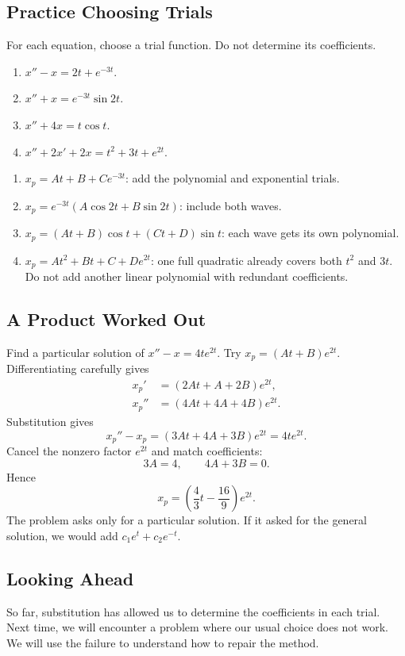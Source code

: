 \documentclass[10pt,letterpaper]{article}
\begin{document}
\subsection{Practice Choosing Trials}
\begin{example}{For each equation, choose a trial function. Do not determine its coefficients.
\begin{enumerate}
\item $x''-x=2t+e^{-3t}$.
\item $x''+x=e^{-3t}\sin 2t$.
\item $x''+4x=t\cos t$.
\item $x''+2x'+2x=t^2+3t+e^{2t}$.
\end{enumerate}}
\begin{enumerate}
\item $x_p=At+B+Ce^{-3t}$: add the polynomial and exponential trials.
\item $x_p=e^{-3t}(A\cos 2t+B\sin 2t)$: include both waves.
\item $x_p=(At+B)\cos t+(Ct+D)\sin t$: each wave gets its own polynomial.
\item $x_p=At^2+Bt+C+De^{2t}$: one full quadratic already covers both $t^2$ and $3t$.
Do not add another linear polynomial with redundant coefficients.
\end{enumerate}
\end{example}

\subsection{A Product Worked Out}
\begin{example}{Find a particular solution of $x''-x=4te^{2t}$.}
Try $x_p=(At+B)e^{2t}$. Differentiating carefully gives
\begin{align*}
x_p'&=(2At+A+2B)e^{2t},\\
x_p''&=(4At+4A+4B)e^{2t}.
\end{align*}
Substitution gives
\[
x_p''-x_p=(3At+4A+3B)e^{2t}=4te^{2t}.
\]
Cancel the nonzero factor $e^{2t}$ and match coefficients:
\[
3A=4,\qquad 4A+3B=0.
\]
Hence
\[
\boxed{x_p=\left(\frac43t-\frac{16}{9}\right)e^{2t}.}
\]
The problem asks only for a particular solution. If it asked for the general
solution, we would add $c_1e^t+c_2e^{-t}$.
\end{example}

\subsection{Looking Ahead}
So far, substitution has allowed us to determine the coefficients in each trial.
Next time, we will encounter a problem where our usual choice does not work.
We will use the failure to understand how to repair the method.
\end{document}
